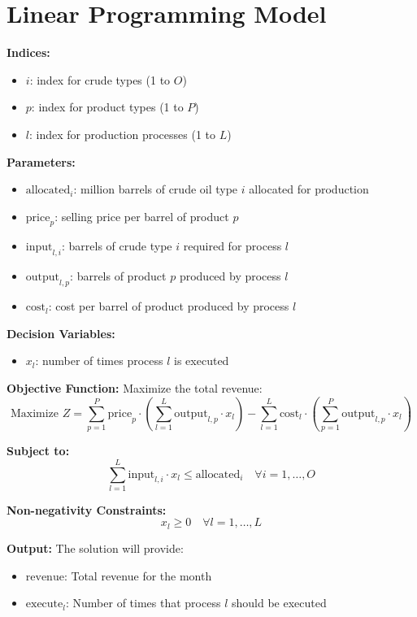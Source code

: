 \documentclass{article}
\begin{document}
\section*{Linear Programming Model}

\textbf{Indices:} 
\begin{itemize}
    \item \( i \): index for crude types (1 to \( O \))
    \item \( p \): index for product types (1 to \( P \))
    \item \( l \): index for production processes (1 to \( L \))
\end{itemize}

\textbf{Parameters:}
\begin{itemize}
    \item \( \text{allocated}_i \): million barrels of crude oil type \( i \) allocated for production
    \item \( \text{price}_p \): selling price per barrel of product \( p \)
    \item \( \text{input}_{l,i} \): barrels of crude type \( i \) required for process \( l \)
    \item \( \text{output}_{l,p} \): barrels of product \( p \) produced by process \( l \)
    \item \( \text{cost}_l \): cost per barrel of product produced by process \( l \)
\end{itemize}

\textbf{Decision Variables:}
\begin{itemize}
    \item \( x_l \): number of times process \( l \) is executed
\end{itemize}

\textbf{Objective Function:} 
Maximize the total revenue:
\[
\text{Maximize } Z = \sum_{p=1}^{P} \text{price}_p \cdot \left( \sum_{l=1}^{L} \text{output}_{l,p} \cdot x_l \right) - \sum_{l=1}^{L} \text{cost}_l \cdot \left( \sum_{p=1}^{P} \text{output}_{l,p} \cdot x_l \right)
\]

\textbf{Subject to:}
\begin{equation}
\sum_{l=1}^{L} \text{input}_{l,i} \cdot x_l \leq \text{allocated}_i \quad \forall i = 1, \ldots, O
\end{equation}

\textbf{Non-negativity Constraints:}
\begin{equation}
x_l \geq 0 \quad \forall l = 1, \ldots, L
\end{equation}

\textbf{Output:}
The solution will provide:
\begin{itemize}
    \item \( \text{revenue} \): Total revenue for the month
    \item \( \text{execute}_l \): Number of times that process \( l \) should be executed
\end{itemize}
\end{document}

